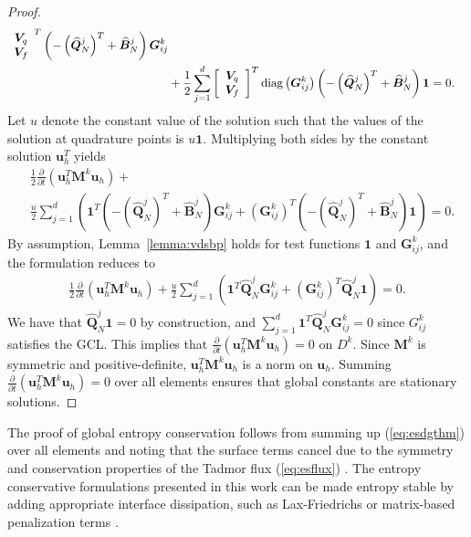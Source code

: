 \documentclass[review]{siamart0216}
\theoremstyle{assumption}
\renewcommand{\hat}[1]{\hat{#1}}
\newcommand{\pd}[2]{\frac{\partial#1}{\partial#2}}
\newcommand{\LRp}[1]{\left( #1 \right)}
\newcommand{\LRs}[1]{\left[ #1 \right]}
\renewcommand{\hat}{\widehat}
\newcommand{\diag}[1]{{\rm diag}\LRp{#1}}
\begin{document}
\begin{proof}
\begin{align*}
{\begin{array}{cc}
\bm{V}_q \\
\bm{V}_f\end{array}}^T \LRp{-\LRp{\hat{\bm{Q}}^j_N}^T +\hat{\bm{B}}^j_N}\bm{G}^k_{ij}\\
&+ \frac{1}{2} \sum_{j=1}^d \LRs{\begin{array}{cc}
\bm{V}_q \\
\bm{V}_f\end{array}}^T\diag{\bm{G}^k_{ij}} \LRp{-\LRp{\hat{\bm{Q}}^j_N}^T +\hat{\bm{B}}^j_N}\bm{1} = 0.
\end{align*}
Let $u$ denote the constant value of the solution such that the values of the solution at quadrature points is $u\bm{1}$.  Multiplying both sides by the constant solution $\bm{u}_h^T$ yields
\begin{align*}
&\frac{1}{2}\pd{}{t}\LRp{\bm{u}_h^T\bm{M}^k\bm{u}_h} + \\
&\frac{u}{2} \sum_{j=1}^d \LRp{\bm{1}^T \LRp{-\LRp{\hat{\bm{Q}}^j_N}^T +\hat{\bm{B}}^j_N}\bm{G}^k_{ij}
+\LRp{\bm{G}^k_{ij}}^T \LRp{-\LRp{\hat{\bm{Q}}^j_N}^T +\hat{\bm{B}}^j_N}\bm{1}} = 0.
\end{align*}
By assumption, Lemma~\ref{lemma:vdsbp} holds for test functions $\bm{1}$ and $\bm{G}^k_{ij}$, and the formulation reduces to
\begin{align*}
\frac{1}{2}\pd{}{t}\LRp{\bm{u}_h^T\bm{M}^k\bm{u}_h} + \frac{u}{2} \sum_{j=1}^d \LRp{\bm{1}^T \hat{\bm{Q}}^j_N\bm{G}^k_{ij}
+\LRp{\bm{G}^k_{ij}}^T \hat{\bm{Q}}^j_N\bm{1}} = 0.
\end{align*}
We have that $\hat{\bm{Q}}^j_N\bm{1} = 0$ by construction, and $\sum_{j=1}^d \bm{1}^T \hat{\bm{Q}}^j_N\bm{G}^k_{ij} = 0$ since $G^k_{ij}$ satisfies the GCL.  This implies that $\pd{}{t}\LRp{\bm{u}_h^T\bm{M}^k\bm{u}_h} = 0$ on $D^k$.  Since $\bm{M}^k$ is symmetric and positive-definite, $\bm{u}_h^T\bm{M}^k\bm{u}_h$ is a norm on $\bm{u}_h$.  Summing $\pd{}{t}\LRp{\bm{u}_h^T\bm{M}^k\bm{u}_h} = 0$ over all elements ensures that global constants are stationary solutions.  
\end{proof}

The proof of global entropy conservation follows from summing up (\ref{eq:esdgthm}) over all elements and noting that the surface terms cancel due to the symmetry and conservation properties of the Tadmor flux (\ref{eq:esflux}) \cite{chan2017discretely}.  The entropy conservative formulations presented in this work can be made entropy stable by adding appropriate interface dissipation, such as Lax-Friedrichs or matrix-based penalization terms \cite{winters2017uniquely, chen2017entropy, chan2017discretely}.  
\end{document}
